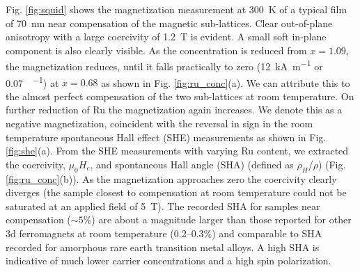 \documentclass[reprint,aip,apl,floatfix,linenumbers,superscriptaddress]{revtex4-1}
\begin{document}
Fig. \ref{fig:squid} shows the magnetization measurement at \SI{300}{\kelvin} of a typical  film of \SI{70}{\nano\metre} near compensation of the magnetic sub-lattices. Clear out-of-plane anisotropy with a large coercivity of \SI{1.2}{\tesla} is evident.  A small soft in-plane component is also clearly visible. As the  concentration is reduced from $x=\num{1.09}$, the magnetization reduces, until it falls practically to zero (\SI{12}{\kilo\ampere\per\metre} or \SI{0.07}{\BohrMagneton\per\formulaunit}) at $x=\num{0.68}$ as shown in Fig. \ref{fig:ru_conc}(a). We can attribute this to the almost perfect compensation of the two  sub-lattices at room temperature. On further reduction of Ru the magnetization again increases. We denote this as a negative magnetization, coincident with the reversal in sign in the room temperature spontaneous Hall effect (SHE) measurements as shown in Fig. \ref{fig:she}(a). From the SHE measurements with varying Ru content, we extracted the coercivity, $\mu_0H_c$, and spontaneous Hall angle (SHA) (defined as $\rho_H$/$\rho$) (Fig. \ref{fig:ru_conc}(b)). As the magnetization approaches zero the coercivity clearly diverges (the sample closest to compensation at room temperature could not be saturated at an applied field of \SI{5}{\tesla}). The recorded SHA for samples near compensation ($\sim \num{5}\%$) are about a magnitude larger than those reported for other 3d ferromagnets at room temperature (\numrange{0.2}{0.3}\%)\cite{dorleijn1976} and comparable to SHA recorded for amorphous rare earth transition metal alloys\cite{Kim2001}. A high SHA is indicative of much lower carrier concentrations and a high spin polarization.
\end{document}
